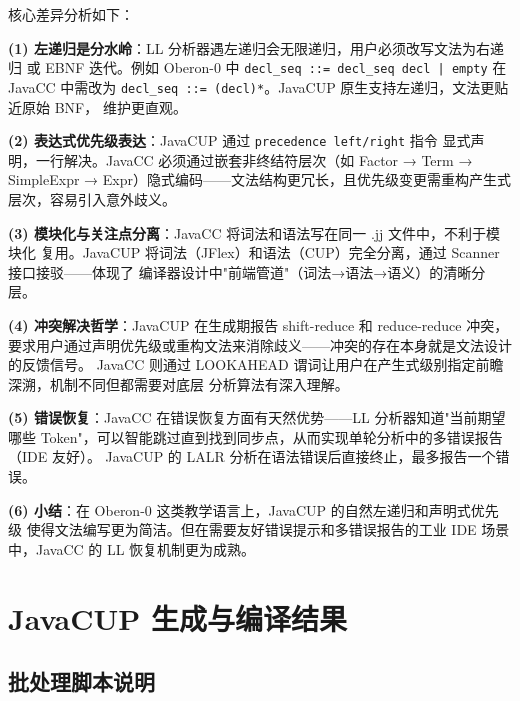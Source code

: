 \documentclass[a4paper]{article}
\begin{document}
核心差异分析如下：

\textbf{(1) 左递归是分水岭}：LL 分析器遇左递归会无限递归，用户必须改写文法为右递归
或 EBNF 迭代。例如 Oberon-0 中 \texttt{decl\_seq ::= decl\_seq decl | empty} 在 JavaCC
中需改为 \texttt{decl\_seq ::= (decl)*}。JavaCUP 原生支持左递归，文法更贴近原始 BNF，
维护更直观。

\textbf{(2) 表达式优先级表达}：JavaCUP 通过 \texttt{precedence left/right} 指令
显式声明，一行解决。JavaCC 必须通过嵌套非终结符层次（如 Factor → Term → SimpleExpr
→ Expr）隐式编码——文法结构更冗长，且优先级变更需重构产生式层次，容易引入意外歧义。

\textbf{(3) 模块化与关注点分离}：JavaCC 将词法和语法写在同一 .jj 文件中，不利于模块化
复用。JavaCUP 将词法（JFlex）和语法（CUP）完全分离，通过 Scanner 接口接驳——体现了
编译器设计中"前端管道"（词法→语法→语义）的清晰分层。

\textbf{(4) 冲突解决哲学}：JavaCUP 在生成期报告 shift-reduce 和 reduce-reduce 冲突，
要求用户通过声明优先级或重构文法来消除歧义——冲突的存在本身就是文法设计的反馈信号。
JavaCC 则通过 LOOKAHEAD 谓词让用户在产生式级别指定前瞻深溯，机制不同但都需要对底层
分析算法有深入理解。

\textbf{(5) 错误恢复}：JavaCC 在错误恢复方面有天然优势——LL 分析器知道"当前期望哪些
Token"，可以智能跳过直到找到同步点，从而实现单轮分析中的多错误报告（IDE 友好）。
JavaCUP 的 LALR 分析在语法错误后直接终止，最多报告一个错误。

\textbf{(6) 小结}：在 Oberon-0 这类教学语言上，JavaCUP 的自然左递归和声明式优先级
使得文法编写更为简洁。但在需要友好错误提示和多错误报告的工业 IDE 场景中，JavaCC 的
LL 恢复机制更为成熟。

\section{JavaCUP 生成与编译结果}

\subsection{批处理脚本说明}
\end{document}
